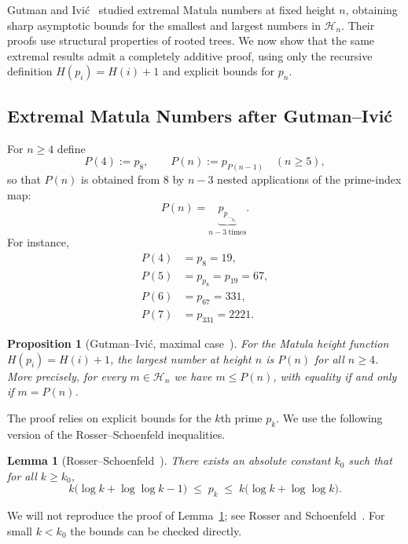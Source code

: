 \documentclass[11pt]{article}
\newtheorem{lemma}{Lemma}
\newtheorem{proposition}{Proposition}
\theoremstyle{definition}
\begin{document}
Gutman and Ivi\'c~\cite{gutman} studied extremal Matula numbers at
fixed height $n$, obtaining sharp asymptotic bounds for the smallest
and largest numbers in $\mathcal{H}_n$.  Their proofs use structural
properties of rooted trees.  We now show that the same extremal
results admit a completely additive proof, using only the recursive
definition $H(p_i)=H(i)+1$ and explicit bounds for $p_n$.

\subsection{Extremal Matula Numbers after Gutman--Ivi\'c}\label{gutman}

For $n\ge4$ define
\[
  P(4) := p_8,\qquad
  P(n) := p_{P(n-1)} \quad (n\ge5),
\]
so that $P(n)$ is obtained from $8$ by $n-3$ nested applications of
the prime-index map:
\[
  P(n) = \underbrace{p_{p_{\cdots_{p_8}}}}_{n-3\ \text{times}}.
\]
For instance,
\[
\begin{aligned}
  P(4)&=p_8=19,\\
  P(5)&=p_{p_8}=p_{19}=67,\\
  P(6)&=p_{67}=331,\\
  P(7)&=p_{331}=2221.
\end{aligned}
\]

\begin{proposition}[Gutman--Ivi\'c, maximal case~\cite{gutman}]\label{prop:Matula-max}
For the Matula height function $H(p_i)=H(i)+1$, the largest number at
height $n$ is $P(n)$ for all $n\ge4$.  More precisely, for every
$m\in\mathcal{H}_n$ we have $m\le P(n)$, with equality if and only if
$m=P(n)$.
\end{proposition}

The proof relies on explicit bounds for the $k$th prime $p_k$.  We use
the following version of the Rosser--Schoenfeld inequalities.

\begin{lemma}[Rosser--Schoenfeld~\cite{RosserSchoenfeld}]\label{lem:RS}
There exists an absolute constant $k_0$ such that for all $k\ge k_0$,
\[
  k\bigl(\log k + \log\log k - 1\bigr)
  \;\le\; p_k
  \;\le\;
  k\bigl(\log k + \log\log k\bigr).
\]
\end{lemma}

We will not reproduce the proof of Lemma~\ref{lem:RS}; see
Rosser and Schoenfeld~\cite{RosserSchoenfeld}.  For small $k<k_0$ the
bounds can be checked directly.
\end{document}
